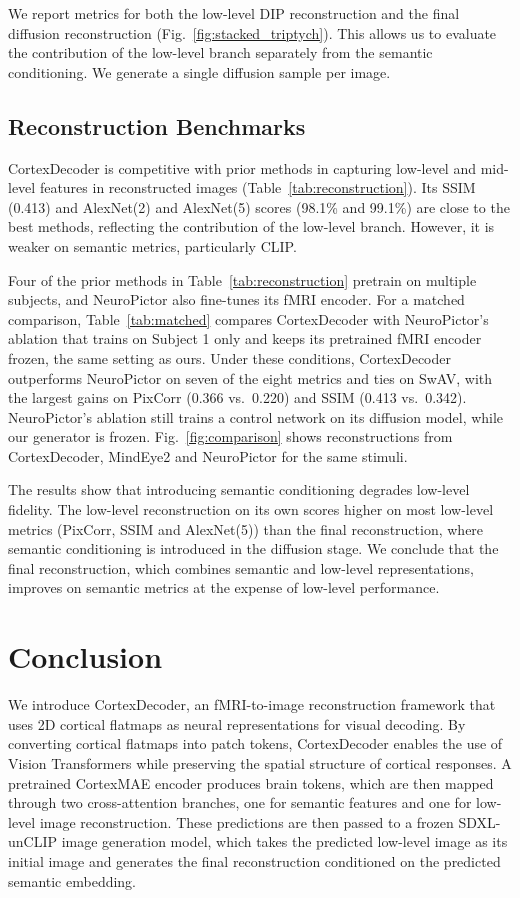 \documentclass[conference]{IEEEtran}
\begin{document}
We report metrics for both the low-level DIP reconstruction and the final diffusion reconstruction (Fig.~\ref{fig:stacked_triptych}). This allows us to evaluate the contribution of the low-level branch separately from the semantic conditioning. We generate a single diffusion sample per image.

\subsection{Reconstruction Benchmarks}
CortexDecoder is competitive with prior methods in capturing low-level and mid-level features in reconstructed images (Table~\ref{tab:reconstruction}). Its SSIM (0.413) and AlexNet(2) and AlexNet(5) scores (98.1\% and 99.1\%) are close to the best methods, reflecting the contribution of the low-level branch. However, it is weaker on semantic metrics, particularly CLIP.

Four of the prior methods in Table~\ref{tab:reconstruction} pretrain on multiple subjects, and NeuroPictor also fine-tunes its fMRI encoder. For a matched comparison, Table~\ref{tab:matched} compares CortexDecoder with NeuroPictor's ablation that trains on Subject 1 only and keeps its pretrained fMRI encoder frozen, the same setting as ours. Under these conditions, CortexDecoder outperforms NeuroPictor on seven of the eight metrics and ties on SwAV, with the largest gains on PixCorr (0.366 vs.\ 0.220) and SSIM (0.413 vs.\ 0.342). NeuroPictor's ablation still trains a control network on its diffusion model, while our generator is frozen. Fig.~\ref{fig:comparison} shows reconstructions from CortexDecoder, MindEye2 and NeuroPictor for the same stimuli.

The results show that introducing semantic conditioning degrades low-level fidelity. The low-level reconstruction on its own scores higher on most low-level metrics (PixCorr, SSIM and AlexNet(5)) than the final reconstruction, where semantic conditioning is introduced in the diffusion stage. We conclude that the final reconstruction, which combines semantic and low-level representations, improves on semantic metrics at the expense of low-level performance.

\section{Conclusion}
\label{sec:conclusion}
We introduce CortexDecoder, an fMRI-to-image reconstruction framework that uses 2D cortical flatmaps as neural representations for visual decoding. By converting cortical flatmaps into patch tokens, CortexDecoder enables the use of Vision Transformers while preserving the spatial structure of cortical responses. A pretrained CortexMAE encoder produces brain tokens, which are then mapped through two cross-attention branches, one for semantic features and one for low-level image reconstruction. These predictions are then passed to a frozen SDXL-unCLIP image generation model, which takes the predicted low-level image as its initial image and generates the final reconstruction conditioned on the predicted semantic embedding.
\end{document}
